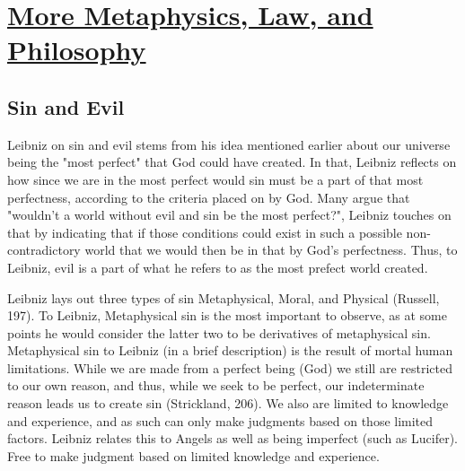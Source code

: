 \documentclass[12pt]{article}
\begin{document}
\section*{\underline{More Metaphysics, Law, and Philosophy}}
    
\subsection*{Sin and Evil}
Leibniz on sin and evil stems from his idea mentioned earlier about our universe being the "most perfect" that God could have created.
In that, Leibniz reflects on how since we are in the most perfect would sin must be a part of that most perfectness, according to the criteria placed on by God.
Many argue that "wouldn't a world without evil and sin be the most perfect?", Leibniz touches on that by indicating that if those conditions could exist in such a possible non-contradictory world that we would then be in that by God's perfectness.
Thus, to Leibniz, evil is a part of what he refers to as the most prefect world created.\\ \par
Leibniz lays out three types of sin Metaphysical, Moral, and Physical (Russell, 197).
To Leibniz, Metaphysical sin is the most important to observe, as at some points he would consider the latter two to be derivatives of metaphysical sin.
Metaphysical sin to Leibniz (in a brief description) is the result of mortal human limitations.
While we are made from a perfect being (God) we still are restricted to our own reason, and thus, while we seek to be perfect, our indeterminate reason leads us to create sin (Strickland, 206). 
We also are limited to knowledge and experience, and as such can only make judgments based on those limited factors. 
Leibniz relates this to Angels as well as being imperfect (such as Lucifer). 
Free to make judgment based on limited knowledge and experience.
\end{document}
